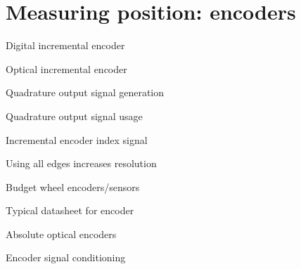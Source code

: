 \documentclass[compress]{beamer}
\begin{document}
\section{Measuring position: encoders}

{
    \begin{frame}{Digital incremental encoder}
    \end{frame}
}
{
    \begin{frame}{Optical incremental encoder}
    \end{frame}
}

{
    \begin{frame}{Quadrature output signal generation}
    \end{frame}
}

{
    \begin{frame}{Quadrature output signal usage}
    \end{frame}
}

{
    \begin{frame}{Incremental encoder index signal}
    \end{frame}
}

{
    \begin{frame}{Using all edges increases resolution}
    \end{frame}
}

{
    \begin{frame}{Budget wheel encoders/sensors}
    \end{frame}
}

{
    \begin{frame}{Typical datasheet for encoder}
    \end{frame}
}

{
    \begin{frame}{Absolute optical encoders}
    \end{frame}
}

{
    \begin{frame}{Encoder signal conditioning}
    \end{frame}
}
\end{document}
